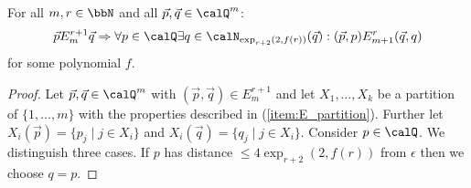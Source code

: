 \begin{lemma}\label{lem:EF_relations}
	For all $m,r\in\bbN$ and all $\vec{p},\vec{q}\in \Qx^m$:  
	\[\vec{p} E^{r+1}_m \vec{q} \Rightarrow \forall p\in \Qx \exists q\in \calN_{\exp_{r+2}(2,f(r))}(\vec{q}): (\vec{p}, p) E^{r}_{m+1} (\vec{q}, q)\]
	for some polynomial $f$.
\end{lemma}
\begin{proof}
	Let $\vec{p}, \vec{q} \in \Qx^m$ with $(\vec{p}, \vec{q}) \in E^{r+1}_m$ and 
	let $X_1,\ldots,X_k$ be a partition of $\{1,\ldots,m\}$ with the properties described in (\ref{item:E_partition}). Further let $X_i(\vec{p}) = \{p_j \mid j\in X_i \}$ and $X_i(\vec{q}) = \{q_j \mid j\in X_i \}$. Consider $p\in \Qx$. We distinguish three cases.
	If $p$ has distance $\leq 4\exp_{r+2}(2, f(r))$ from $\epsilon$ then we choose $q=p$.
	

\end{proof}
